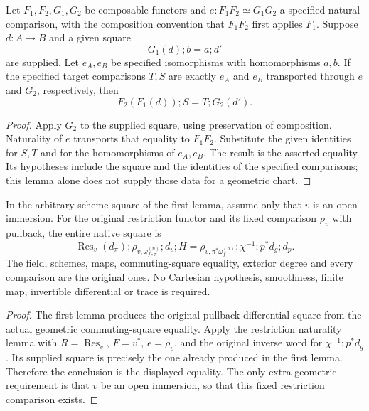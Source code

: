 \begin{lemma}
\label{lem:kn-native-restricted-differential-functorial-assembly}
\leanok
Let $F_1,F_2,G_1,G_2$ be composable functors and
$e:F_1F_2\simeq G_1G_2$ a specified natural comparison, with the
composition convention that $F_1F_2$ first applies $F_1$.
Suppose $d:A\to B$ and a given square
\[
 G_1(d);b=a;d'
\]
are supplied. Let $e_A,e_B$ be specified isomorphisms with homomorphisms
$a,b$. If the specified target comparisons $T,S$ are exactly
$e_A$ and $e_B$ transported through $e$ and $G_2$, respectively, then
\[
 F_2(F_1(d));S=T;G_2(d').
\]
\end{lemma}
\begin{proof}
Apply $G_2$ to the supplied square, using preservation of composition.
Naturality of $e$ transports that equality to $F_1F_2$. Substitute the
given identities for $S,T$ and for the homomorphisms of $e_A,e_B$.
The result is the asserted equality. Its hypotheses include the square
and the identities of the specified comparisons; this lemma alone does
not supply those data for a geometric chart.
\end{proof}

\begin{theorem}
\label{thm:kn-native-restricted-differential-general-square}
\leanok
In the arbitrary scheme square of the first lemma, assume only that
$v$ is an open immersion. For the original restriction functor and its
fixed comparison $\rho_v$ with pullback, the entire native square is
\[
 \operatorname{Res}_v(d_\pi);
 \rho_{v,\omega_{f\circ\pi}^{(n)}};d_v;H
 =
 \rho_{v,\pi^*\omega_f^{(n)}};\chi^{-1};p^*d_g;d_p.
\]
The field, schemes, maps, commuting-square equality, exterior degree and
every comparison are the original ones. No Cartesian hypothesis,
smoothness, finite map, invertible differential or trace is required.
\end{theorem}
\begin{proof}
The first lemma produces the original pullback differential square from
the actual geometric commuting-square equality. Apply the restriction
naturality lemma with $R=\operatorname{Res}_v$, $F=v^*$,
$e=\rho_v$, and the original inverse word for $\chi^{-1};p^*d_g$.
Its supplied square is precisely the one already produced in the first
lemma. Therefore the conclusion is the displayed equality. The only
extra geometric requirement is that $v$ be an open immersion, so that
this fixed restriction comparison exists.
\end{proof}
